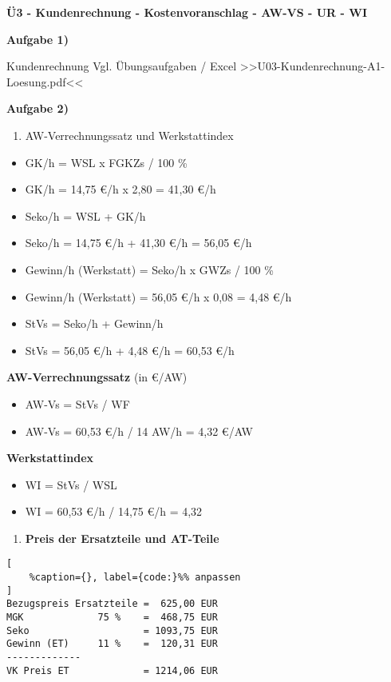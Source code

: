 \textbf{Ü3 - Kundenrechnung - Kostenvoranschlag - AW-VS - UR - WI}

\textbf{Aufgabe 1)}

Kundenrechnung Vgl. Übungsaufgaben / Excel
>>U03-Kundenrechnung-A1-Loesung.pdf<<

\textbf{Aufgabe 2)}

\begin{enumerate}
\def\labelenumi{\alph{enumi})}
\item
  AW-Verrechnungssatz und Werkstattindex
\end{enumerate}

\begin{itemize}
\item
  GK/h = WSL x FGKZs / 100 \%
\item
  GK/h = 14,75 €/h x 2,80 = 41,30 €/h
\item
  Seko/h = WSL + GK/h
\item
  Seko/h = 14,75 €/h + 41,30 €/h = 56,05 €/h
\item
  Gewinn/h (Werkstatt) = Seko/h x GWZs / 100 \%
\item
  Gewinn/h (Werkstatt) = 56,05 €/h x 0,08 = 4,48 €/h
\item
  StVs = Seko/h + Gewinn/h
\item
  StVs = 56,05 €/h + 4,48 €/h = 60,53 €/h
\end{itemize}

\textbf{AW-Verrechnungssatz} (in €/AW)

\begin{itemize}
\item
  AW-Vs = StVs / WF
\item
  AW-Vs = 60,53 €/h / 14 AW/h = 4,32 €/AW
\end{itemize}

\textbf{Werkstattindex}

\begin{itemize}
\item
  WI = StVs / WSL
\item
  WI = 60,53 €/h / 14,75 €/h = 4,32
\end{itemize}

\begin{enumerate}
\def\labelenumi{\alph{enumi})}
\setcounter{enumi}{1}
\item
  \textbf{Preis der Ersatzteile und AT-Teile}
\end{enumerate}

\lstset{language=Python}%
\begin{lstlisting}[
	%caption={}, label={code:}%% anpassen
]
Bezugspreis Ersatzteile =  625,00 EUR
MGK             75 %    =  468,75 EUR
Seko                    = 1093,75 EUR
Gewinn (ET)     11 %    =  120,31 EUR
-------------
VK Preis ET             = 1214,06 EUR
\end{lstlisting}

